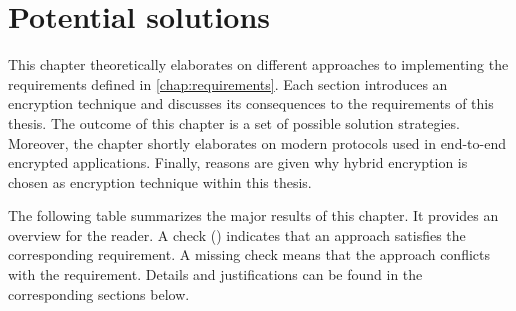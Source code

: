 \documentclass[../main.tex]{subfiles}
\begin{document}
\chapter{Potential solutions}
\label{chap:overview}

This chapter theoretically elaborates on different approaches to implementing the requirements defined in \cref{chap:requirements}.
Each section introduces an encryption technique and discusses its consequences to the requirements of this thesis.
The outcome of this chapter is a set of possible solution strategies.
Moreover, the chapter shortly elaborates on modern protocols used in end-to-end encrypted applications. 
Finally, reasons are given why hybrid encryption is chosen as encryption technique within this thesis.

The following table summarizes the major results of this chapter.
It provides an overview for the reader.
A check (\checkmark) indicates that an approach satisfies the corresponding requirement.
A missing check means that the approach conflicts with the requirement.
Details and justifications can be found in the corresponding sections below.
\end{document}
